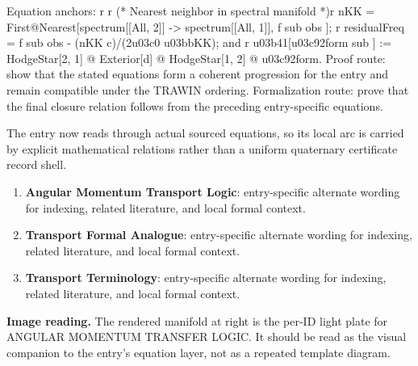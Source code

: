 Equation anchors: r r (* Nearest neighbor in spectral manifold *)r nKK = First@Nearest[spectrum[[All, 2]] -> spectrum[[All, 1]], f sub obs ]; r residualFreq = f sub obs - (nKK c)/(2u03c0 u03bbKK); and r u03b41[u03c92form sub ] := HodgeStar[2, 1] @ Exterior[d] @ HodgeStar[1, 2] @ u03c92form. Proof route: show that the stated equations form a coherent progression for the entry and remain compatible under the TRAWIN ordering. Formalization route: prove that the final closure relation follows from the preceding entry-specific equations.

The entry now reads through actual sourced equations, so its local arc is carried by explicit mathematical relations rather than a uniform quaternary certificate record shell.
\endgroup

\begin{enumerate}[leftmargin=1.6em,itemsep=6pt,topsep=4pt]
\item \textbf{Angular Momentum Transport Logic}: entry-specific alternate wording for indexing, related literature, and local formal context.
\item \textbf{Transport Formal Analogue}: entry-specific alternate wording for indexing, related literature, and local formal context.
\item \textbf{Transport Terminology}: entry-specific alternate wording for indexing, related literature, and local formal context.
\end{enumerate}

\begin{samepage}
\noindent\begin{minipage}[t]{0.45\linewidth}
\vspace{0pt}
\raggedright
\scriptsize\textbf{Image reading.} The rendered manifold at right is the per-ID light plate for ANGULAR MOMENTUM TRANSFER LOGIC. It should be read as the visual companion to the entry's equation layer, not as a repeated template diagram.\par
\end{minipage}\hfill
\begin{minipage}[t]{0.53\linewidth}
\vspace*{-0.10in}
\raggedright
{}
\end{minipage}
\end{samepage}

\clearpage


